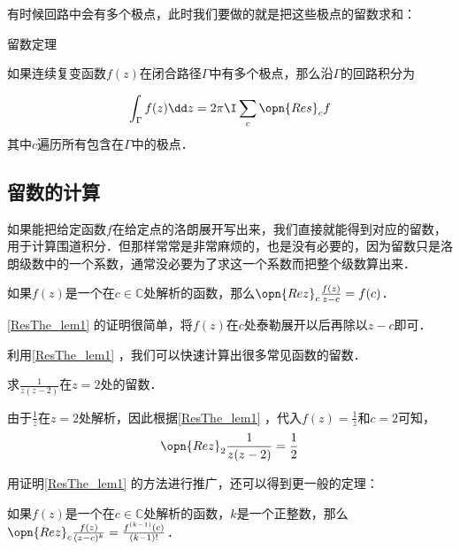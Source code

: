 有时候回路中会有多个极点，此时我们要做的就是把这些极点的留数求和：

\begin{theorem}{留数定理}

如果连续复变函数$f(z)$在闭合路径$\Gamma$中有多个极点，那么沿$\Gamma$的回路积分为

\begin{equation}
\int_\Gamma f(z)\dd z=2\pi\I\sum_{c}\opn{Res}_cf
\end{equation}
其中$c$遍历所有包含在$\Gamma$中的极点．


\end{theorem}




\subsection{留数的计算}



如果能把给定函数$f$在给定点的洛朗展开写出来，我们直接就能得到对应的留数，用于计算围道积分．但那样常常是非常麻烦的，也是没有必要的，因为留数只是洛朗级数中的一个系数，通常没必要为了求这一个系数而把整个级数算出来．

\begin{lemma}{}\label{ResThe_lem1}
如果$f(z)$是一个在$c\in\mathbb{C}$处解析的函数，那么$\opn{Rez}_c\frac{f(z)}{z-c}=f(c)$．
\end{lemma}

\autoref{ResThe_lem1} 的证明很简单，将$f(z)$在$c$处泰勒展开以后再除以$z-c$即可．

利用\autoref{ResThe_lem1} ，我们可以快速计算出很多常见函数的留数．

\begin{example}{}
求$\frac{1}{z(z-2)}$在$z=2$处的留数．

由于$\frac{1}{z}$在$z=2$处解析，因此根据\autoref{ResThe_lem1} ，代入$f(z)=\frac{1}{z}$和$c=2$可知，
\begin{equation}
\opn{Rez}_2\frac{1}{z(z-2)}=\frac{1}{2}
\end{equation}
\end{example}

用证明\autoref{ResThe_lem1} 的方法进行推广，还可以得到更一般的定理：

\begin{theorem}{}\label{ResThe_the2}
如果$f(z)$是一个在$c\in\mathbb{C}$处解析的函数，$k$是一个正整数，那么$\opn{Rez}_c\frac{f(z)}{(z-c)^k}=\frac{f^{(k-1)}(c)}{(k-1)!}$．
\end{theorem}

